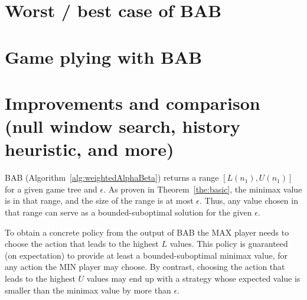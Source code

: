 \documentclass[letterpaper]{article} %
\newcommand{\pess}{\mathit{L}}
\newcommand{\opti}{\mathit{U}}
\newcommand{\rootnode}{\mathit{n_1}}
\begin{document}

\section{Worst / best case of BAB} 




\section{Game plying with BAB} 




\section{Improvements and comparison (null window search, history heuristic, and more)} 




\label{sec:action}
BAB (Algorithm~\ref{alg:weightedAlphaBeta}) returns a range $[\pess(\rootnode), \opti(\rootnode)]$ for a given game tree and $\epsilon$. As proven in Theorem~\ref{the:basic}, the minimax value is in that range, and the size of the range is at most $\epsilon$. Thus, any value chosen in that range can serve as a bounded-suboptimal solution for the given $\epsilon$. 

To obtain a concrete policy from the output of BAB the MAX player needs to choose the action that leads to the highest $\pess$ values. This policy is guaranteed (on expectation) to provide at least a bounded-suboptimal minimax value, for any action the MIN player may choose. By contrast, choosing the action that leads to the highest $\opti$ values may end up with a strategy whose expected value is smaller than the minimax value by more than $\epsilon$. %
\end{document}
